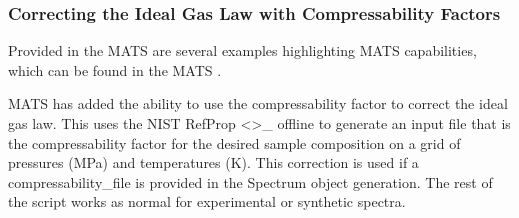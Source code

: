\documentclass[letterpaper,10pt,english]{sphinxmanual}
\let\sphinxpxdimen\pdfpxdimen\else\newdimen\sphinxpxdimen
\begin{document}
\begin{sphinxVerbatim}[commandchars=\\\{\}]
 
     
\end{sphinxVerbatim}

\noindent\sphinxincludegraphics[width=656\sphinxpxdimen,height=387\sphinxpxdimen]{{Hg_Results}.png}

\sphinxstepscope


\subsubsection{Correcting the Ideal Gas Law with Compressability Factors}
\label{\detokenize{Correcting the Ideal Gas Law with Compressability Factor:correcting-the-ideal-gas-law-with-compressability-factors}}\label{\detokenize{Correcting the Ideal Gas Law with Compressability Factor::doc}}
\sphinxAtStartPar
Provided in the MATS are several examples highlighting MATS capabilities, which can be found in the MATS .

\sphinxAtStartPar
MATS has added the ability to use the compressability factor to correct the ideal gas law.  This uses the NIST RefProp \textless{}\textgreater{}\textasciigrave{}\_ offline to generate an input file that is the compressability factor for the desired sample composition on a grid of pressures (MPa) and temperatures (K).  This correction is used if a compressability\_file is provided in the Spectrum object generation.  The rest of the script works as normal for experimental or synthetic spectra.
\end{document}
